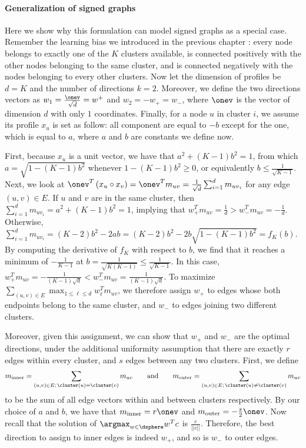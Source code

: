 \paragraph{Generalization of signed graphs}
\label{par:generalization_of_signed_graphs}

Here we show why this formulation can model signed graphs as a special case. Remember the learning
bias we introduced in the previous chapter : every node belongs to
exactly one of the $K$ clusters available, is connected positively with the other nodes belonging to
the same cluster, and is connected negatively with the nodes belonging to every other clusters. Now
let the dimension of profiles be $d=K$ and the number of directions $k=2$. Moreover, we define the
two directions vectors as $w_1 = \frac{\onev}{\sqrt{d}} = w^+$ and $w_2 = -w_+ = w_-$, where
$\onev$ is the vector of dimension $d$ with only $1$ coordinates. Finally, for a node $u$ in
cluster $i$, we assume its profile $x_u$ is set as follow: all component are equal to $-b$ except
for the \ith{} one, which is equal to $a$, where $a$ and $b$ are constants we define now.

First, because $x_u$ is a unit vector, we have that $a^2 + (K-1)b^2=1$, from which $a =
\sqrt{1-(K-1)b^2}$ whenever $1-(K-1)b^2 \geq 0$, or equivalently $b \leq \frac{1}{\sqrt{K-1}}$.
Next, we look at $\onev^T\left(x_u \circ x_v\right) = \onev^T m_{uv} = \frac{1}{\sqrt{d}}
\sum_{i=1}^d m_{{uv}_i}$ for any edge $(u,v) \in E$. If $u$ and $v$ are in the same cluster, then
$\sum_{i=1}^d m_{{uv}_i} = a^2 + (K-1)b^2 = 1$, implying that $w_+^T m_{uv} = \frac{1}{d} > w_-^T
m_{uv} = -\frac{1}{d}$. Otherwise, $\sum_{i=1}^d m_{{uv}_i} = (K-2)b^2 - 2ab = (K-2)b^2 -
2b\sqrt{1-(K-1)b^2} = f_K(b)$. By computing the derivative of $f_K$ with respect to $b$, we find
that it reaches a minimum of $-\frac{1}{K-1}$ at $b = \frac{1}{\sqrt{K(K-1)}} \leq
\frac{1}{\sqrt{K-1}}$. In this case, $w_+^T m_{uv} = -\frac{1}{(K-1) \sqrt{d}} < w_-^T m_{uv} =
\frac{1}{(K-1) \sqrt{d}}$. To maximize $\sum_{(u,v)\in E} \max_{1 \leq \ell \leq d} w_\ell^T
m_{uv}$, we therefore assign $w_+$ to edges whose both endpoints belong to the same cluster, and
$w_-$ to edges joining two different clusters.

Moreover, given this assignment, we can show that $w_+$ and $w_-$ are the optimal directions, under
the additional uniformity assumption that there are exactly $r$ edges within every cluster, and $s$
edges between any two clusters. First, we define
\begin{equation*}
  m_{\mathrm{inner}} = \sum_{(u,v) \in E;\, \cluster(u)=\cluster(v)} m_{uv} \qquad \text{and} \qquad
  m_{\mathrm{outer}} = \sum_{(u,v) \in E;\, \cluster(u)\neq \cluster(v)} m_{uv}
\end{equation*}
to be the sum of all edge vectors within and between clusters respectively. By our choice of $a$ and
$b$, we have that $m_{\mathrm{inner}} = r\onev$ and $m_{\mathrm{outer}} = -\frac{s}{2}\onev$. Now
recall that the solution of $\argmax_{w\in \dsphere} w^T c$ is $\frac{c}{||c||}$. Therefore, the
best direction to assign to inner edges is indeed $w_+$, and so is $w_-$ to outer edges.

